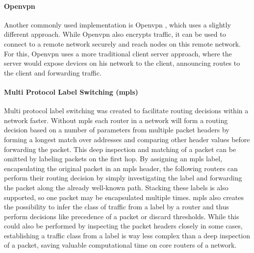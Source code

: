 \paragraph{Open\acrshort{vpn}} Another commonly used implementation is Open\acrshort{vpn} \cite{openvpn}, which uses a slightly different approach. While Open\acrshort{vpn} also encrypts traffic, it can be used to connect to a remote network securely and reach nodes on this remote network. For this, Open\acrshort{vpn} uses a more traditional client server approach, where the server would expose devices on his network to the client, announcing routes to the client and forwarding traffic.

\paragraph{Multi Protocol Label Switching (\acrshort{mpls})}
\label{mpls}
Multi protocol label switching \cite{rfc3031} was created to facilitate routing decisions within a network faster. Without \acrshort{mpls} each router in a network will form a routing decision based on a number of parameters from multiple packet headers by forming a longest match over addresses and comparing other header values before forwarding the packet. This deep inspection and matching of a packet can be omitted by labeling packets on the first hop. By assigning an \acrshort{mpls} label, encapsulating the original packet in an \acrshort{mpls} header, the following routers can perform their routing decision by simply investigating the label and forwarding the packet along the already well-known path. Stacking these labels is also supported, so one packet may be encapsulated multiple times. \acrshort{mpls} also creates the possibility to infer the class of traffic from a label by a router and thus perform decisions like precedence of a packet or discard thresholds. While this could also be performed by inspecting the packet headers closely in some cases, establishing a traffic class from a label is way less complex than a deep inspection of a packet, saving valuable computational time on core routers of a network.
